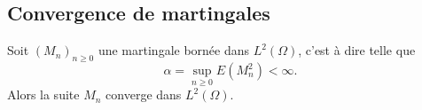 \subsection{Convergence de martingales}

\begin{theorem}     \label{ThobysyWI}
    Soit \( (M_n)_{n\geq 0}\) une martingale bornée dans \( L^2(\Omega)\), c'est à dire telle que
    \begin{equation}
        \alpha=\sup_{n\geq 0}E(M_n^2)<\infty.
    \end{equation}
    Alors la suite \( M_n\) converge dans \( L^2(\Omega)\).
\end{theorem}

